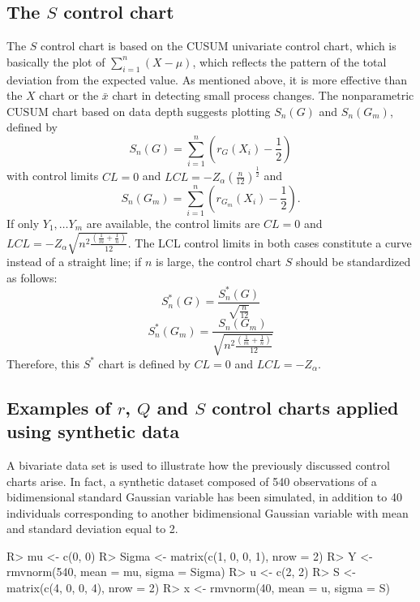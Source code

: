 \subsection{The $S$ control chart}
The $S$ control chart is based on the CUSUM univariate control chart, 
which is basically the plot of $\sum_{i=1}^{n}\left( X - \mu \right)$, which reflects the pattern of the total deviation from the expected value. 
As mentioned above, it is more effective than the $X$ chart or the $\bar{x}$ chart in detecting small process changes. 
The nonparametric CUSUM chart based on data depth suggests plotting $S_n(G)$ and $S_n(G_m)$, defined by 
$$S_n\left( G\right) = \sum_{i=1}^{n}\left( r_G\left( X_i\right)  - \frac{1}{2} \right)$$ 
with control limits $CL = 0$ and $LCL = -Z_{\alpha}\left(\frac{n}{12}\right)^{\frac{1}{2}}$ and
$$S_n\left( G_m\right) = \sum_{i=1}^{n}\left( r_{G_{m}}\left( X_i\right)  - \frac{1}{2} \right).$$
If only $Y_1, \dots Y_m$ are available, the control limits are $CL = 0$ and $LCL = -Z_{\alpha}\sqrt{n^2\frac{\left(\frac{1}{m}+\frac{1}{n}\right)}{12}}$.
The LCL control limits in both cases constitute a curve instead of a straight line; if $n$ is large, the control chart $S$ should be standardized as follows:
$$S_n^{*}\left( G\right) = \frac{S_n^{*}\left(G\right)}{\sqrt{\frac{n}{12}}}$$
$$S_n^{*}\left( G_m\right) = \frac{S_n\left(G_m\right)}{\sqrt{n^2\frac{\left(\frac{1}{m}+\frac{1}{n}\right)}{12}}}$$
Therefore, this $S^*$ chart is defined by $CL = 0$ and $LCL = -Z_{\alpha}$.

\subsection{Examples of $r$, $Q$ and $S$ control charts applied using synthetic data}
A bivariate data set is used to illustrate how the previously discussed control charts arise.
In fact, a synthetic dataset composed of 540 observations of a bidimensional standard Gaussian variable has been 
simulated, in addition to 40 individuals corresponding to another bidimensional Gaussian variable with mean 
and standard deviation equal to 2.
\begin{example}
R> mu <- c(0, 0)
R> Sigma <- matrix(c(1, 0, 0, 1), nrow = 2)
R> Y <- rmvnorm(540, mean = mu, sigma = Sigma)
R> u <- c(2, 2)
R> S <- matrix(c(4, 0, 0, 4), nrow = 2)
R> x <- rmvnorm(40, mean = u, sigma = S)
\end{example}

